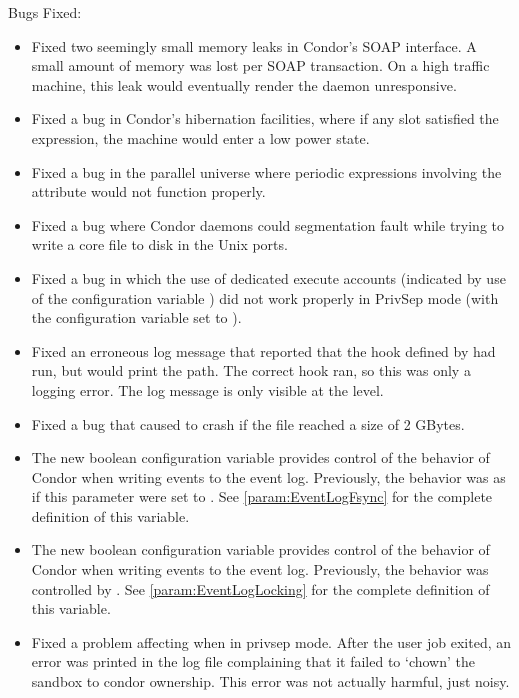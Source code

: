 \noindent Bugs Fixed:

\begin{itemize}

\item Fixed two seemingly small memory leaks in Condor's SOAP
interface. A small amount of memory was lost per SOAP transaction. On
a high traffic machine, this leak would eventually render the
 daemon unresponsive.

\item Fixed a bug in Condor's hibernation facilities, where if any slot
satisfied the  expression, the machine would enter
a low power state.

\item Fixed a bug in the parallel universe where periodic expressions
involving the  attribute would not function properly.

\item Fixed a bug where Condor daemons could segmentation fault while trying
to write a core file to disk in the Unix ports.

\item Fixed a bug in which the use of dedicated execute accounts
(indicated by use of the configuration variable
) did not work properly
in PrivSep mode (with the configuration variable 
set to ).

\item Fixed an erroneous log message that reported that
the hook defined by  had run,
but would print the  path.
The correct hook ran, so this was only a logging error.
The log message is only visible at the  level.

\item Fixed a bug that caused  to crash if the
 file reached a size of 2 GBytes.

\item The new boolean configuration variable
   provides control of the behavior of
  Condor when writing events to the event log.  Previously,
  the behavior was as if this parameter were set to .
  See \ref{param:EventLogFsync} for the complete definition of
  this variable.

\item The new boolean configuration variable
   provides control of the behavior of
  Condor when writing events to the event log.  Previously,
  the behavior was controlled by .
  See \ref{param:EventLogLocking} for the complete definition of
  this variable.

\item Fixed a problem affecting  when in privsep mode.
After the user job exited, an error was printed in the
 log file complaining that it failed to `chown' the
sandbox to condor ownership.  This error was not actually harmful,
just noisy.

\end{itemize}

